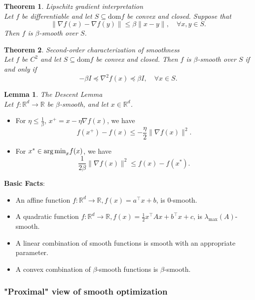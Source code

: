 \documentclass[11pt]{book} %
\newtheorem{theorem}{Theorem}[section]
\newtheorem{lemma}{Lemma}[section]
\begin{document}
\begin{theorem} {Lipschitz gradient interpretation } \\
Let \( f \) be differentiable and let \( S \subseteq \text{dom} f \) be convex and closed. Suppose that
\[\|\nabla f(x) - \nabla f(y)\| \leq \beta \|x - y\|, \quad \forall x, y \in S.\]
Then \( f \) is \(\beta\)-smooth over \( S \).
\end{theorem}

\begin{theorem} {Second-order characterization of smoothness} \\
Let \( f \) be \( C^2 \) and let \( S \subseteq \text{dom} f \) be convex and closed. Then \( f \) is \(\beta\)-smooth over \( S \) if and only if
\[-\beta I \preceq \nabla^2 f(x) \preceq \beta I, \quad \forall x \in S.\]
\end{theorem}


\begin {lemma} {The Descent Lemma} \\
Let \( f : \mathbb{R}^d \rightarrow \mathbb{R} \) be \(\beta\)-smooth, and let \( x \in \mathbb{R}^d \).
\end{lemma}

\begin{itemize}
    \item For \( \eta \leq \frac{1}{\beta} \), \( x^{+} = x - \eta \nabla f(x) \), we have
    \[ f(x^{+}) - f(x) \leq -\frac{\eta}{2} \|\nabla f(x)\|^2. \]
    \item For \( x^{*} \in \text{arg\,min}_x f(x) \), we have
    \[ \frac{1}{2\beta} \|\nabla f(x)\|^2 \leq f(x) - f(x^{*}). \]
\end{itemize}

\textbf{Basic Facts}:
\begin{itemize}
    \item An affine function \( f : \mathbb{R}^d \rightarrow \mathbb{R}, f(x) = a^\top x + b \), is 0-smooth.
    \item A quadratic function \( f : \mathbb{R}^d \rightarrow \mathbb{R}, f(x) = \frac{1}{2} x^\top A x + b^\top x + c \), is \( \lambda_{\text{max}}(A) \)-smooth.
    \item A linear combination of smooth functions is smooth with an appropriate parameter.
    \item A convex combination of \(\beta\)-smooth functions is \(\beta\)-smooth.
\end{itemize}

\subsubsection{"Proximal" view of smooth optimization}
\end{document}
